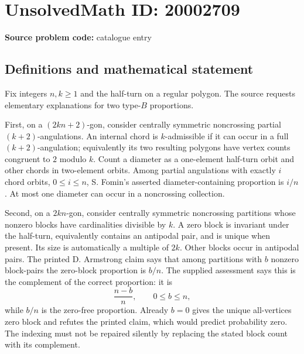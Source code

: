 \documentclass[11pt]{article}
\begin{document}
\section*{UnsolvedMath ID: 20002709}
\textbf{Source problem code:} catalogue entry
\subsection{Definitions and mathematical statement}
Fix integers $n,k\ge1$ and the half-turn on a regular polygon. The source requests elementary explanations for two type-$B$ proportions.

First, on a $(2kn+2)$-gon, consider centrally symmetric noncrossing partial $(k+2)$-angulations. An internal chord is $k$-admissible if it can occur in a full $(k+2)$-angulation; equivalently its two resulting polygons have vertex counts congruent to $2$ modulo $k$. Count a diameter as a one-element half-turn orbit and other chords in two-element orbits. Among partial angulations with exactly $i$ chord orbits, $0\le i\le n$, S. Fomin's asserted diameter-containing proportion is $i/n$. At most one diameter can occur in a noncrossing collection.

Second, on a $2kn$-gon, consider centrally symmetric noncrossing partitions whose nonzero blocks have cardinalities divisible by $k$. A zero block is invariant under the half-turn, equivalently contains an antipodal pair, and is unique when present. Its size is automatically a multiple of $2k$. Other blocks occur in antipodal pairs. The printed D. Armstrong claim says that among partitions with $b$ nonzero block-pairs the zero-block proportion is $b/n$. The supplied assessment says this is the complement of the correct proportion: it is
\[
 \frac{n-b}{n},\qquad 0\le b\le n,
\]
while $b/n$ is the zero-free proportion. Already $b=0$ gives the unique all-vertices zero block and refutes the printed claim, which would predict probability zero. The indexing must not be repaired silently by replacing the stated block count with its complement.
\end{document}
